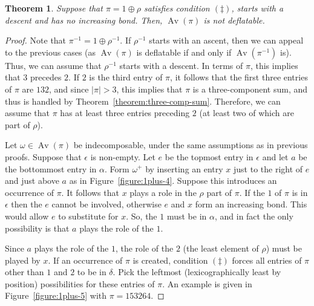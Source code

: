 \documentclass[10pt]{article}
\theoremstyle{plain}
\newtheorem{theorem}{Theorem}[section]
\newcommand{\Av}{\operatorname{Av}}
\begin{document}
\begin{theorem}
	\label{theorem:bonds-dec1}
	Suppose that $\pi = 1 \oplus \rho$ satisfies condition $(\ddagger)$, starts with a descent and has no increasing bond. Then, $\Av(\pi)$ is not deflatable.
\end{theorem}
\begin{proof}
	Note that $\pi^{-1} = 1 \oplus \rho^{-1}$. If $\rho^{-1}$ starts with an ascent, then we can appeal to the previous cases (as $\Av(\pi)$ is deflatable if and only if $\Av(\pi^{-1})$ is). Thus, we can assume that $\rho^{-1}$ starts with a descent. In terms of $\pi$, this implies that $3$ precedes $2$. If $2$ is the third entry of $\pi$, it follows that the first three entries of $\pi$ are $132$, and since $|\pi| > 3$, this implies that $\pi$ is a three-component sum, and thus is handled by Theorem~\ref{theorem:three-comp-sum}. Therefore, we can assume that $\pi$ has at least three entries preceding $2$ (at least two of which are part of $\rho$).
	
	Let $\omega \in \Av(\pi)$ be indecomposable, under the same assumptions as in previous proofs. Suppose that $\epsilon$ is non-empty. Let $e$ be the topmost entry in $\epsilon$ and let $a$ be the bottommost entry in $\alpha$. Form $\omega^+$ by inserting an entry $x$ just to the right of $e$ and just above $a$ as in Figure~\ref{figure:1plus-4}. Suppose this introduces an occurrence of $\pi$. It follows that $x$ plays a role in the $\rho$ part of $\pi$. If the $1$ of $\pi$ is in $\epsilon$ then the $e$ cannot be involved, otherwise $e$ and $x$ form an increasing bond. This would allow $e$ to substitute for $x$. So, the $1$ must be in $\alpha$, and in fact the only possibility is that $a$ plays the role of the $1$.
  
	Since $a$ plays the role of the $1$, the role of the $2$ (the least element of $\rho$) must be played by $x$. If an occurrence of $\pi$ is created, condition $(\ddagger)$ forces all entries of $\pi$ other than $1$ and $2$ to be in $\delta$. Pick the leftmost (lexicographically least by position) possibilities for these entries of $\pi$. An example is given in Figure~\ref{figure:1plus-5} with $\pi = 153264$.
	

\end{proof}
\end{document}
